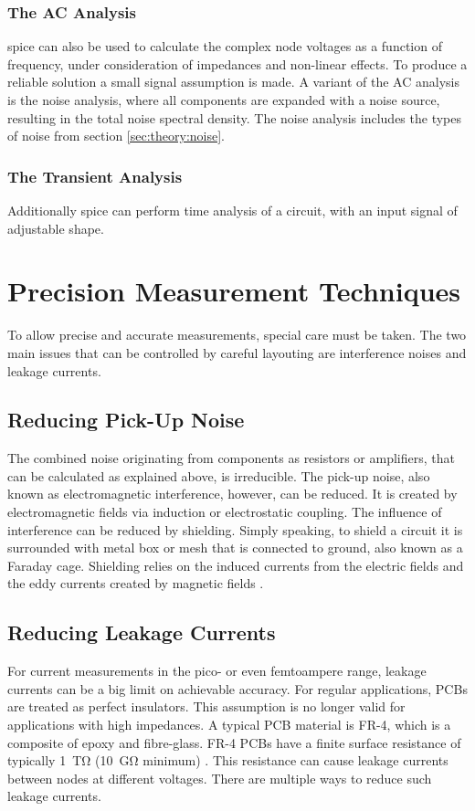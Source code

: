 \subsubsection*{The AC Analysis}
\ac{spice} can also be used to calculate the complex node voltages as a function of frequency, under consideration of impedances and non-linear effects. To produce a reliable solution a small signal assumption is made. A variant of the AC analysis is the noise analysis, where all components are expanded with a noise source, resulting in the total noise spectral density. The noise analysis includes the types of noise from section \ref{sec:theory:noise}. 

\subsubsection*{The Transient Analysis}
Additionally \ac{spice} can perform time analysis of a circuit, with an input signal of adjustable shape.

\section{Precision Measurement Techniques}
To allow precise and accurate measurements, special care must be taken. The two main issues that can be controlled by careful layouting are interference noises and leakage currents.
\label{sec:theory:pecision}
\subsection{Reducing Pick-Up Noise}
The combined noise originating from components as resistors or amplifiers, that can be calculated as explained above, is irreducible. The pick-up noise, also known as electromagnetic interference, however, can be reduced. It is created by electromagnetic fields via induction or electrostatic coupling. The influence of interference can be reduced by shielding. Simply speaking, to shield a circuit it is surrounded with metal box or mesh that is connected to ground, also known as a Faraday cage. Shielding relies on the induced currents from the electric fields and the eddy currents created by magnetic fields \cite{shielding}.

\subsection{Reducing Leakage Currents}
For current measurements in the pico- or even femtoampere range, leakage currents can be a big limit on achievable accuracy. For regular applications, \aclp{PCB} are treated as perfect insulators. This assumption is no longer valid for applications with high impedances. A typical PCB material is \ac{FR-4}, which is a composite of epoxy and fibre-glass. \ac{FR-4} \acp{PCB} have a finite surface resistance of typically \SI{1}{\tera\ohm} (\SI{10}{\giga\ohm} minimum) \cite{FR4datasheet}. This resistance can cause leakage currents between nodes at different voltages. There are multiple ways to reduce such leakage currents.

